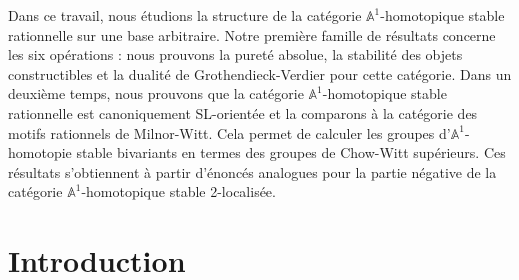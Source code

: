 \documentclass[JEP,XML,SOM,Unicode]{cedram}
\theoremstyle{remark}
\theoremstyle{definition}
\numberwithin{equation}{thm}
\begin{document}




\begin{altabstract}
Dans ce travail, nous étudions la structure de la catégorie $\mathbb{A}^1$-homotopique stable rationnelle sur une base arbitraire. Notre première famille de résultats concerne les six opérations : nous prouvons la pureté absolue, la stabilité des objets constructibles et la dualité de Grothendieck-Verdier pour cette catégorie. Dans un deuxième temps, nous prouvons que la catégorie $\mathbb{A}^1$-homotopique stable rationnelle est canoniquement SL-orientée et la comparons à la catégorie des motifs rationnels de Milnor-Witt. Cela permet de calculer les groupes d'$\mathbb{A}^1$-homotopie stable bivariants en termes des groupes de Chow-Witt supérieurs. Ces résultats s'obtiennent à partir d'énoncés analogues pour la partie négative de la catégorie $\mathbb{A}^1$-homotopique stable 2-localisée.
\end{altabstract}

\maketitle
\enlargethispage{.05\baselineskip}%
\tableofcontents
\mainmatter

\section{Introduction}
\end{document}
